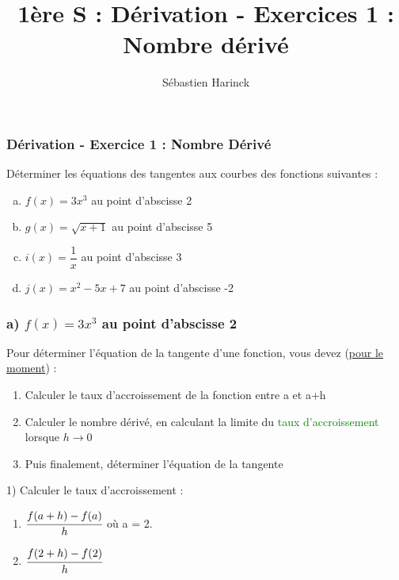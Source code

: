 \documentclass[t]{beamer}
\title{1ère S : Dérivation - Exercices 1 : Nombre dérivé}
\author{Sébastien Harinck}
\institute{www.cours-futes.com}
\date{}
\begin{document}
\begin{frame}
\titlepage
\end{frame}

\begin{frame}[label=pagebanale]
\frametitle{Dérivation - Exercice 1 : Nombre Dérivé}
\pause
Déterminer les équations des tangentes aux courbes des fonctions suivantes :
\pause
\begin{enumerate}[a)]
\item<+-> $f(x) = 3x^3$ au point d'abscisse 2
\item<+-> $g(x) = \sqrt{x+1}$ au point d'abscisse 5
\item<+-> $i(x) = \dfrac{1}{x}$ au point d'abscisse 3
\item<+-> $j(x) = x^2 - 5x +7$ au point d'abscisse -2
\end{enumerate}
\end{frame}

\begin{frame}
\frametitle{a) $f(x) = 3x^3$ au point d'abscisse 2}
\pause
\begin{block}{}
Pour déterminer l'équation de la tangente d'une fonction, vous devez (\underline{pour le moment}) :
\pause
\begin{enumerate}[1.]
\item Calculer le taux d'accroissement de la fonction entre a et a+h
\pause
\item Calculer le nombre dérivé, \pause en calculant la limite du \textcolor{green}{taux d'accroissement} lorsque $h \rightarrow 0$
\pause
\item Puis finalement, déterminer l'équation de la tangente
\end{enumerate}
\end{block}
\pause
\begin{block}{1) Calculer le taux d'accroissement :}
\pause
\begin{enumerate}[]
\item<+-> $\cfrac{f(a+h)-f(a)}{h}$ où a = 2.
\item<+-> \(\cfrac{f(2+h)-f(2)}{h} \)
\end{enumerate}
\end{block}
\end{frame}
\end{document}

